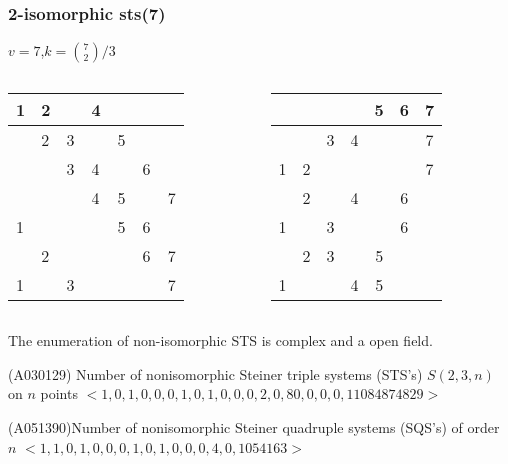 \begin{frame}
\frametitle{2-isomorphic sts(7)}
$v=7$,\quad $k=\binom{7}{2}/3$

\begin{columns}
	\begin{table}
		\begin{tabular}{|l|l|l|l|c|c|c|}
			\hline
			1 & 2 & ~ & 4 & ~ & ~ & ~ \\ \hline
			~ & 2 & 3 & ~ & 5 & ~ & ~ \\ \hline
			~ & ~ & 3 & 4 & ~ & 6 & ~ \\ \hline
			~ & ~ & ~ & 4 & 5 & ~ & 7 \\ \hline
			1 & ~ & ~ & ~ & 5 & 6 & ~ \\ \hline
			~ & 2 & ~ & ~ & ~ & 6 & 7 \\ \hline
			1 & ~ & 3 & ~ & ~ & ~ & 7 \\ \hline
		\end{tabular}
	\end{table}
	\pause
	\begin{table}[]
		\begin{tabular}{|c|c|c|c|c|c|c|}
			\hline
			&   &   &   & 5 & 6 & 7 \\ \hline
			&   & 3 & 4 &   &   & 7 \\ \hline
			1 & 2 &   &   &   &   & 7 \\ \hline
			& 2 &   & 4 &   & 6 &   \\ \hline
			1 &   & 3 &   &   & 6 &   \\ \hline
			& 2 & 3 &   & 5 &   &   \\ \hline
			1 &   &   & 4 & 5 &   &   \\ \hline
		\end{tabular}
	\end{table}
\end{columns}
\end{frame}


\begin{frame}
\pause[1]
\begin{block}{}
The enumeration of non-isomorphic STS is complex and a open field.
\end{block}

\pause[2]
\begin{block}{(A030129) Number of nonisomorphic Steiner triple systems (STS's) $S(2,3,n)$ on $n$ points}
	$<1, 0, 1, 0, 0, 0, 1, 0, 1, 0, 0, 0, 2, 0, 80, 0, 0, 0, 11084874829>$%
\end{block}
\begin{block}{(A051390)Number of nonisomorphic Steiner quadruple systems (SQS's) of order $n$ }
	$<1, 1, 0, 1, 0, 0, 0, 1, 0, 1, 0, 0, 0, 4, 0, 1054163>$%
\end{block}
\end{frame}

